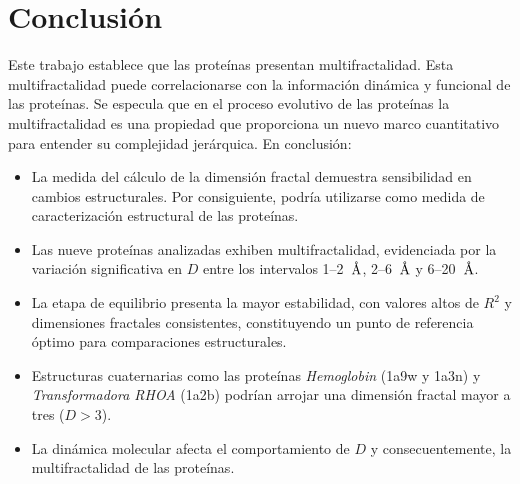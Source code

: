 \chapter{Conclusión}


Este trabajo establece que las proteínas presentan multifractalidad. Esta multifractalidad puede correlacionarse con la información dinámica y funcional de las proteínas. Se especula que en el proceso evolutivo de las prote\'{i}nas la multifractalidad es una propiedad que proporciona un nuevo marco cuantitativo para entender su complejidad jer\'{a}rquica. En conclusión:


\begin{itemize}
	\item La medida del c\'{a}lculo de la dimensi\'{o}n fractal demuestra sensibilidad en
	 cambios estructurales. Por consiguiente, podr\'{i}a utilizarse como medida de caracterizaci\'{o}n 
	 estructural de las prote\'{i}nas.
	
	\item Las nueve prote\'{i}nas analizadas exhiben multifractalidad, evidenciada por la variaci\'{o}n 
	significativa en $D$ entre los intervalos 1--2~$\textup{\r{A}}$, 2--6~$\textup{\r{A}}$ y 6--20~$\textup{\r{A}}$.
	
	\item La etapa de equilibrio presenta la mayor estabilidad, con valores altos de $R^2$ y 
	dimensiones fractales consistentes, constituyendo un punto de referencia \'{o}ptimo para comparaciones estructurales.
	
	\item Estructuras cuaternarias como las prote\'{i}nas \textit{Hemoglobin} (1a9w y 1a3n) y \textit{Transformadora RHOA} (1a2b) podr\'{i}an arrojar una dimensi\'{o}n fractal mayor a tres ($D>3$).
	
	
	\item La din\'{a}mica molecular afecta el comportamiento de $D$ y consecuentemente, la multifractalidad de las prote\'{i}nas.
\end{itemize}

